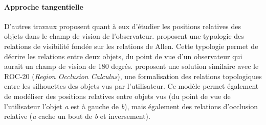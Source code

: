 \paragraph{Approche tangentielle}

D'autres travaux proposent quant à eux d'étudier les positions
relatives des objets dans le champ de vision de l'observateur.
\textcite{Santos2015} proposent une typologie des
relations de visibilité fondée sur les relations de Allen. Cette
typologie permet de décrire les relations entre deux objets, du point
de vue d'un observateur qui aurait un champ de vision de 180 degrés.
\textcite{Randell2001} proposent une solution similaire avec le ROC-20
(\emph{Region Occlusion Calculus}), une formalisation des relations
topologiques entre les silhouettes des objets vus par
l'utilisateur. Ce modèle permet également de modéliser des positions
relatives entre objets vus (\eg du point de vue de l'utilisateur
l'objet \emph{a} est à gauche de \emph{b}), mais également des
relations d'occlusion relative (\eg \emph{a} cache un bout de \emph{b}
et inversement).

